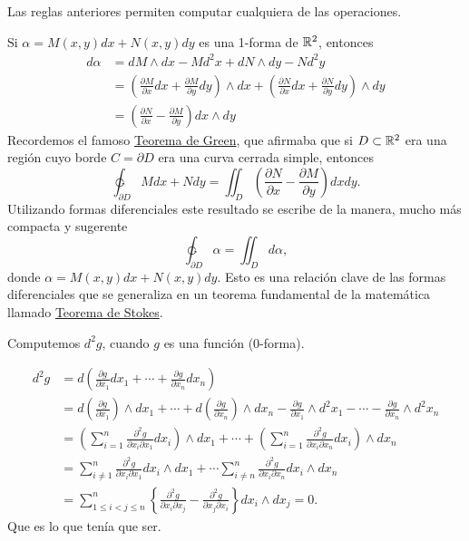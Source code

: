 Las reglas anteriores permiten computar cualquiera de las operaciones.
\begin{ejemplo} Si $\alpha=M(x,y)dx+N(x,y)dy$ es una 1-forma de $\mathbb{R}^2$, entonces
\[ \begin{split}
    d\alpha&=dM\wedge dx-Md^2x + dN\wedge dy-Nd^2y\\
    &=\left(\frac{\partial M}{\partial x}dx+ \frac{\partial M}{\partial y}dy\right)\wedge dx+
    \left(\frac{\partial N}{\partial x}dx+ \frac{\partial N}{\partial y}dy\right)\wedge dy\\
    &= \left(\frac{\partial N}{\partial x}- \frac{\partial M}{\partial y}\right) dx\wedge dy
   \end{split}
\]
Recordemos el famoso \href{https://es.wikipedia.org/wiki/Teorema_de_Green}{Teorema de Green}, que afirmaba que si $D\subset \mathbb{R}^2$ era una región cuyo borde $C=\partial D$ era una curva cerrada simple, entonces
\[\ointctrclockwise_{\partial D} Mdx +Ndy=\iint_D \left(\frac{\partial N}{\partial x}- \frac{\partial M}{\partial y}\right) dx dy.\]
Utilizando formas diferenciales este resultado se escribe de la manera, mucho más compacta y sugerente
\[\ointctrclockwise_{\partial D} \alpha = \iint_Dd\alpha,\]
donde $\alpha =M(x,y)dx+N(x,y)dy$.  Esto es una relación clave de las formas diferenciales que se generaliza en un teorema fundamental de la matemática llamado \href{https://es.wikipedia.org/wiki/Teorema_de_Stokes}{Teorema de Stokes}.
\end{ejemplo}




\begin{ejemplo} Computemos $d^2g$, cuando $g$ es una función (0-forma).

\[
\begin{split}
d^2g&=d\left(\frac{\partial g}{\partial x_1}dx_1+\cdots+\frac{\partial g}{\partial x_n}dx_n\right)\\
&= d\left(\frac{\partial g}{\partial x_1}\right)\wedge dx_1+\cdots+d\left(\frac{\partial g}{\partial x_n}\right)\wedge dx_n
    -\frac{\partial g}{\partial x_1}\wedge d^2x_1-\cdots-\frac{\partial g}{\partial x_n}\wedge d^2x_n\\
    &=\left(\sum_{i=1}^n\frac{\partial^2g}{\partial x_i\partial x_1} dx_i\right)\wedge dx_1+\cdots+\left(\sum_{i=1}^n\frac{\partial^2g}{\partial x_i\partial x_n} dx_i\right)\wedge dx_n\\
    &= \sum_{i\neq 1}^n\frac{\partial^2g}{\partial x_i\partial x_1} dx_i\wedge dx_1+\cdots
    \sum_{i\neq n}^n\frac{\partial^2g}{\partial x_i\partial x_n} dx_i\wedge dx_n\\
    &=\sum_{1\leq i<j\leq n}^n\left\{\frac{\partial^2g}{\partial x_i\partial x_j}- \frac{\partial^2g}{\partial x_j\partial x_i}\right \} dx_i\wedge dx_j=0.
\end{split}
\]
Que es lo que tenía que ser.


\end{ejemplo}





